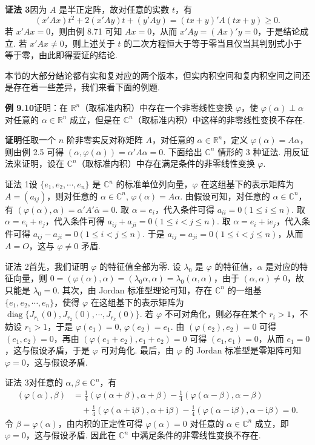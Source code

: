 \documentclass[UTF8,12pt,a4paper,fontset=fandol]{ctexart}
\begin{document}
\noindent\textbf{证法 3}\quad 因为 $A$ 是半正定阵，故对任意的实数 $t$，有
\[
(x'Ax)t^2+2(x'Ay)t+(y'Ay)=(tx+y)'A(tx+y)\ge 0.
\]
若 $x'Ax=0$，则由例 8.71 可知 $Ax=0$，从而 $x'Ay=(Ax)'y=0$，于是结论成立. 若 $x'Ax\ne 0$，则上述关于 $t$ 的二次方程恒大于等于零当且仅当其判别式小于等于零，由此即得要证的结论.

本节的大部分结论都有实和复对应的两个版本，但实内积空间和复内积空间之间还是存在着一些差异，我们来看下面的例题.

\noindent\textbf{例 9.10}\quad 证明：在 $\mathbb{R}^n$（取标准内积）中存在一个非零线性变换 $\varphi$，使 $\varphi(\alpha)\perp\alpha$ 对任意的 $\alpha\in\mathbb{R}^n$ 成立，但是在 $\mathbb{C}^n$（取标准内积）中这样的非零线性变换不存在.

\noindent\textbf{证明}\quad 任取一个 $n$ 阶非零实反对称矩阵 $A$，对任意的 $\alpha\in\mathbb{R}^n$，定义 $\varphi(\alpha)=A\alpha$，则由例 2.5 可得 $(\alpha,\varphi(\alpha))=\alpha'A\alpha=0$. 下面给出 $\mathbb{C}^n$ 情形的 3 种证法. 用反证法来证明，设在 $\mathbb{C}^n$（取标准内积）中存在满足条件的非零线性变换 $\varphi$.

证法 1\quad 设 $\{e_1,e_2,\cdots,e_n\}$ 是 $\mathbb{C}^n$ 的标准单位列向量，$\varphi$ 在这组基下的表示矩阵为 $A=(a_{ij})$，则对任意的 $\alpha\in\mathbb{C}^n$, $\varphi(\alpha)=A\alpha$. 由假设可知，对任意的 $\alpha\in\mathbb{C}^n$，有 $(\varphi(\alpha),\alpha)=\alpha'A'\overline{\alpha}=0$. 取 $\alpha=e_i$，代入条件可得 $a_{ii}=0(1\le i\le n)$. 取 $\alpha=e_i+e_j$，代入条件可得 $a_{ij}+a_{ji}=0(1\le i<j\le n)$. 取 $\alpha=e_i+\mathrm{i}e_j$，代入条件可得 $a_{ij}-a_{ji}=0(1\le i<j\le n)$. 于是 $a_{ij}=a_{ji}=0(1\le i<j\le n)$，从而 $A=O$，这与 $\varphi\ne 0$ 矛盾.

证法 2\quad 首先，我们证明 $\varphi$ 的特征值全部为零. 设 $\lambda_0$ 是 $\varphi$ 的特征值，$\alpha$ 是对应的特征向量，则 $0=(\varphi(\alpha),\alpha)=(\lambda_0\alpha,\alpha)=\lambda_0(\alpha,\alpha)$，由于 $(\alpha,\alpha)\ne 0$，故只能是 $\lambda_0=0$. 其次，由 Jordan 标准型理论可知，存在 $\mathbb{C}^n$ 的一组基 $\{e_1,e_2,\cdots,e_n\}$，使得 $\varphi$ 在这组基下的表示矩阵为 $\operatorname{diag}\{J_{r_1}(0),J_{r_2}(0),\cdots,J_{r_k}(0)\}$. 若 $\varphi$ 不可对角化，则必存在某个 $r_i>1$，不妨设 $r_1>1$，于是 $\varphi(e_1)=0$, $\varphi(e_2)=e_1$. 由 $(\varphi(e_2),e_2)=0$ 可得 $(e_1,e_2)=0$，再由 $(\varphi(e_1+e_2),e_1+e_2)=0$ 可得 $(e_1,e_1)=0$，从而 $e_1=0$，这与假设矛盾，于是 $\varphi$ 可对角化. 最后，由 $\varphi$ 的 Jordan 标准型是零矩阵可知 $\varphi=0$，这与假设矛盾.

证法 3\quad 对任意的 $\alpha,\beta\in\mathbb{C}^n$，有
\[
\begin{aligned}
(\varphi(\alpha),\beta)
&=\frac14(\varphi(\alpha+\beta),\alpha+\beta)-\frac14(\varphi(\alpha-\beta),\alpha-\beta)\\
&\quad+\frac{\mathrm{i}}4(\varphi(\alpha+\mathrm{i}\beta),\alpha+\mathrm{i}\beta)
-\frac{\mathrm{i}}4(\varphi(\alpha-\mathrm{i}\beta),\alpha-\mathrm{i}\beta)=0.
\end{aligned}
\]
令 $\beta=\varphi(\alpha)$，由内积的正定性可得 $\varphi(\alpha)=0$ 对任意的 $\alpha\in\mathbb{C}^n$ 成立，即 $\varphi=0$，这与假设矛盾. 因此在 $\mathbb{C}^n$ 中满足条件的非零线性变换不存在.
\end{document}
